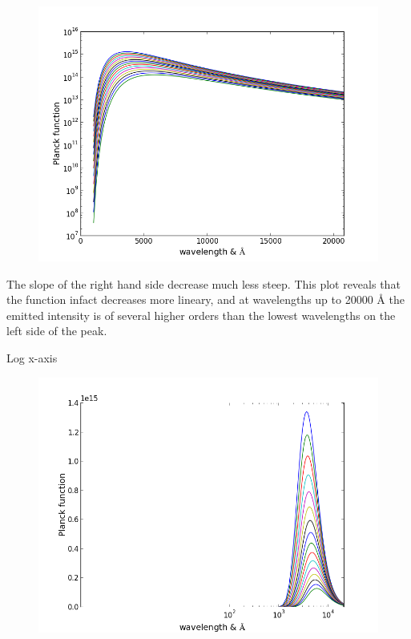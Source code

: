 \documentclass[norsk,a4paper,12pt]{article}
\begin{document}
\begin{figure}[H] 
\begin{center} 
\includegraphics[scale=0.5]{ssa31_2.png} 
 

\caption{} 
\end{center} 
\end{figure}


The slope of the right hand side decrease much less steep. This plot reveals that the function infact decreases 
more lineary, and at wavelengths up to 20000 Å the emitted intensity is of several higher orders than the lowest 
wavelengths on the left side of the peak.

Log x-axis

\begin{figure}[H] 
\begin{center} 
\includegraphics[scale=0.5]{ssa31_3.png} 
 

\caption{} 
\end{center} 
\end{figure}
\end{document}
